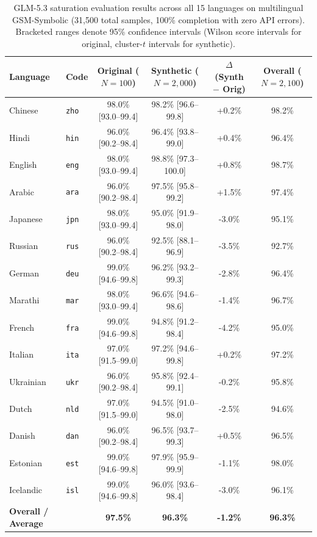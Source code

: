 \begin{table}[t]
\centering
\small
\begin{tabular}{llcccc}
\toprule
\textbf{Language} & \textbf{Code} & \textbf{Original} ($N=100$) & \textbf{Synthetic} ($N=2{,}000$) & \textbf{$\Delta$ (Synth $-$ Orig)} & \textbf{Overall} ($N=2{,}100$) \\
\midrule
Chinese & \texttt{zho} & 98.0\% \scriptsize[93.0--99.4] & 98.2\% \scriptsize[96.6--99.8] & +0.2\% & 98.2\% \\
Hindi & \texttt{hin} & 96.0\% \scriptsize[90.2--98.4] & 96.4\% \scriptsize[93.8--99.0] & +0.4\% & 96.4\% \\
English & \texttt{eng} & 98.0\% \scriptsize[93.0--99.4] & 98.8\% \scriptsize[97.3--100.0] & +0.8\% & 98.7\% \\
Arabic & \texttt{ara} & 96.0\% \scriptsize[90.2--98.4] & 97.5\% \scriptsize[95.8--99.2] & +1.5\% & 97.4\% \\
Japanese & \texttt{jpn} & 98.0\% \scriptsize[93.0--99.4] & 95.0\% \scriptsize[91.9--98.0] & -3.0\% & 95.1\% \\
Russian & \texttt{rus} & 96.0\% \scriptsize[90.2--98.4] & 92.5\% \scriptsize[88.1--96.9] & -3.5\% & 92.7\% \\
German & \texttt{deu} & 99.0\% \scriptsize[94.6--99.8] & 96.2\% \scriptsize[93.2--99.3] & -2.8\% & 96.4\% \\
Marathi & \texttt{mar} & 98.0\% \scriptsize[93.0--99.4] & 96.6\% \scriptsize[94.6--98.6] & -1.4\% & 96.7\% \\
French & \texttt{fra} & 99.0\% \scriptsize[94.6--99.8] & 94.8\% \scriptsize[91.2--98.4] & -4.2\% & 95.0\% \\
Italian & \texttt{ita} & 97.0\% \scriptsize[91.5--99.0] & 97.2\% \scriptsize[94.6--99.8] & +0.2\% & 97.2\% \\
Ukrainian & \texttt{ukr} & 96.0\% \scriptsize[90.2--98.4] & 95.8\% \scriptsize[92.4--99.1] & -0.2\% & 95.8\% \\
Dutch & \texttt{nld} & 97.0\% \scriptsize[91.5--99.0] & 94.5\% \scriptsize[91.0--98.0] & -2.5\% & 94.6\% \\
Danish & \texttt{dan} & 96.0\% \scriptsize[90.2--98.4] & 96.5\% \scriptsize[93.7--99.3] & +0.5\% & 96.5\% \\
Estonian & \texttt{est} & 99.0\% \scriptsize[94.6--99.8] & 97.9\% \scriptsize[95.9--99.9] & -1.1\% & 98.0\% \\
Icelandic & \texttt{isl} & 99.0\% \scriptsize[94.6--99.8] & 96.0\% \scriptsize[93.6--98.4] & -3.0\% & 96.1\% \\
\midrule
\textbf{Overall / Average} & & \textbf{97.5\%} & \textbf{96.3\%} & \textbf{-1.2\%} & \textbf{96.3\%} \\
\bottomrule
\end{tabular}
\caption{GLM-5.3 saturation evaluation results across all 15 languages on multilingual GSM-Symbolic (31,500 total samples, 100\% completion with zero API errors). Bracketed ranges denote 95\% confidence intervals (Wilson score intervals for original, cluster-$t$ intervals for synthetic).}
\label{tab:glm53-saturation-accuracy}
\end{table}
